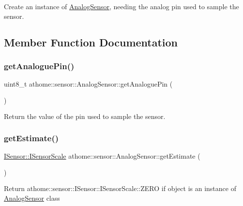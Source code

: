 Create an instance of \mbox{\hyperlink{classathome_1_1sensor_1_1_analog_sensor}{Analog\+Sensor}}, needing the analog pin used to sample the sensor. 

\subsection{Member Function Documentation}
\mbox{\label{classathome_1_1sensor_1_1_analog_sensor_ac4eab6ad6117e8e6689f9e1d9fb05015}} 
\subsubsection{\texorpdfstring{get\+Analogue\+Pin()}{getAnaloguePin()}}
{\footnotesize\ttfamily uint8\+\_\+t athome\+::sensor\+::\+Analog\+Sensor\+::get\+Analogue\+Pin (\begin{DoxyParamCaption}{ }\end{DoxyParamCaption})}

Return the value of the pin used to sample the sensor. \mbox{\label{classathome_1_1sensor_1_1_analog_sensor_a728e2f65638f488cd1829c5f318531db}} 
\subsubsection{\texorpdfstring{get\+Estimate()}{getEstimate()}}
{\footnotesize\ttfamily \mbox{\hyperlink{classathome_1_1sensor_1_1_i_sensor_aa70bc27a4c17c86caf96cca776541ddf}{I\+Sensor\+::\+I\+Sensor\+Scale}} athome\+::sensor\+::\+Analog\+Sensor\+::get\+Estimate (\begin{DoxyParamCaption}{ }\end{DoxyParamCaption})\hspace{0.3cm}{\ttfamily [virtual]}}

Return athome\+::sensor\+::\+I\+Sensor\+::\+I\+Sensor\+Scale\+::\+Z\+E\+RO if object is an instance of \mbox{\hyperlink{classathome_1_1sensor_1_1_analog_sensor}{Analog\+Sensor}} class 

